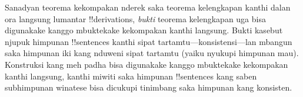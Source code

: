 \documentclass[../../../include/open-logic-section]{subfiles}
\begin{document}
Sanadyan teorema kekompakan nderek saka teorema kelengkapan kanthi
dalan ora langsung lumantar !!{derivation}s, \emph{bukti} teorema
kelengkapan uga bisa digunakake kanggo mbuktekake kekompakan kanthi
langsung. Bukti kasebut njupuk himpunan !!{sentence}s
kanthi sipat tartamtu---konsistensi---lan mbangun  saka
himpunan iki kang nduweni sipat tartamtu (yaiku nyukupi himpunan mau). Konstruksi kang meh padha bisa
digunakake kanggo mbuktekake kekompakan kanthi langsung, kanthi miwiti
saka himpunan !!{sentence}s kang saben subhimpunan winatese bisa
dicukupi tinimbang saka himpunan kang konsisten.
\end{document}
